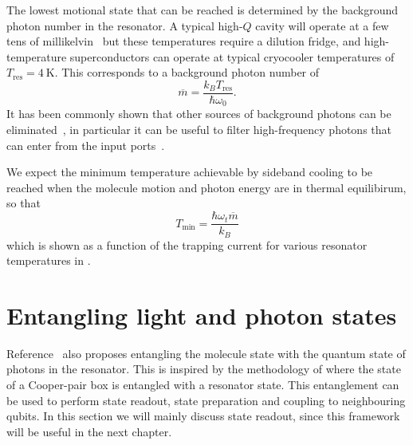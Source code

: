 The lowest motional state that can be reached is determined by the background
photon number in the resonator. A typical high-$Q$ cavity will operate at a few
tens of millikelvin~\cite{doi:10.1063/1.3010859} but these temperatures require
a dilution fridge, and high-temperature superconductors can operate at typical
cryocooler temperatures of $T_\text{res}=\SI{4}{\kelvin}$. This corresponds
to a background photon number of
%
\begin{equation}
  \overline{m} = \frac{k_B T_\text{res}}{\hbar \omega_0}.
\end{equation}
%
It has been commonly shown that other sources of background photons can be
eliminated~\cite{Wallraff2004}, in particular it can be useful to filter
high-frequency photons that can enter from the input
ports~\cite{doi:10.1063/1.3638063}. 

We expect the minimum temperature achievable by sideband cooling to be reached
when the molecule motion and photon energy are in thermal equilibirum, so that
%
\begin{equation}
  T_\text{min} = \frac{\hbar \omega_t \overline{m}}{k_B}
\end{equation}
%
which is shown as a function of the trapping current for various resonator
temperatures in . 

\section{Entangling light and photon states}

Reference~\cite{Andre2006} also proposes entangling the molecule state with the
quantum state of photons in the resonator. This is inspired by the methodology
of  where the state of a Cooper-pair box is
entangled with a resonator state. This entanglement can be used to perform
state readout, state preparation and coupling to neighbouring qubits. In this
section we will mainly discuss state readout, since this framework will be
useful in the next chapter.
%

